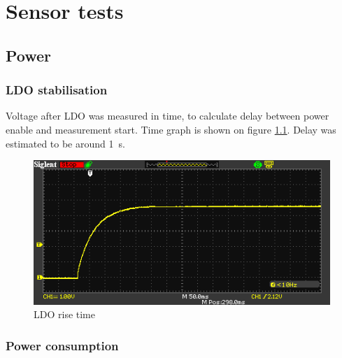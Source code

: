 \chapter{Sensor tests}


\section{Power}
    \subsection{LDO stabilisation}
        Voltage after LDO was measured in time, to calculate delay between power enable and measurement start. Time graph is shown on figure \ref{LDO_rise_time}. Delay was estimated to be around \SI{1}{\second}.

        \begin{figure}[H]
            \centering
            \includegraphics[width=0.8\paperwidth]{img/07/rise_time.png}
            \caption{LDO rise time}
            \label{LDO_rise_time}
        \end{figure}

    \subsection{Power consumption}

